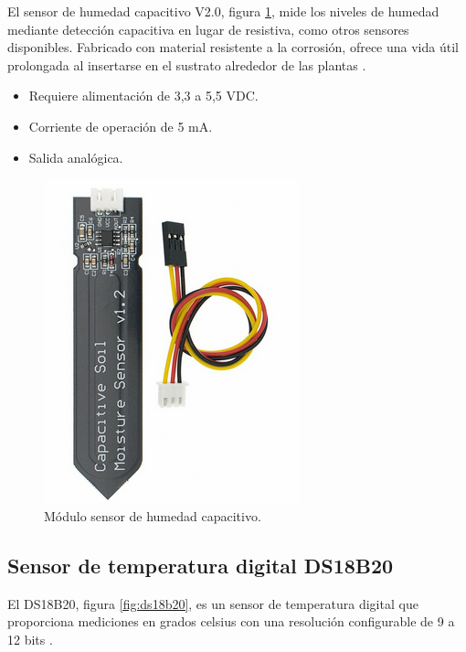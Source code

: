 El sensor de humedad capacitivo V2.0, figura \ref{fig:moisture}, mide los niveles de humedad mediante detección capacitiva en lugar de resistiva, como otros sensores disponibles. Fabricado con material resistente a la corrosión, ofrece una vida útil prolongada al insertarse en el sustrato alrededor de las plantas \cite{MOISTURE}.

\begin{itemize}
	\item Requiere alimentación de 3,3 a 5,5 VDC.
	\item Corriente de operación de 5 mA.
	\item Salida analógica.
\end{itemize}


\begin{figure}[h]
\centering
\includegraphics[scale=.5]{./Figures/moisture.png}
	\caption{Módulo sensor de humedad capacitivo\protect\footnotemark.}
	\label{fig:moisture}
\end{figure}



\subsection{Sensor de temperatura digital DS18B20}

El DS18B20, figura \ref{fig:ds18b20}, es un sensor de temperatura digital que proporciona mediciones en grados celsius con una resolución configurable de 9 a 12 bits \cite{DS18B20}. %

